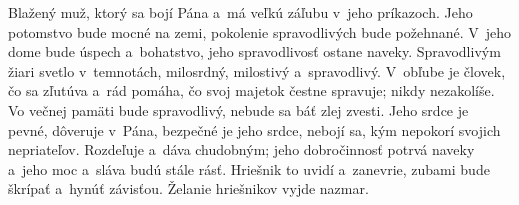 Blažený muž, ktorý sa bojí Pána
a~má veľkú záľubu v~jeho príkazoch.
\versseparator
Jeho potomstvo bude mocné na zemi,
pokolenie spravodlivých bude požehnané.
\versseparator
V~jeho dome bude úspech a~bohatstvo,
jeho spravodlivosť ostane naveky.
\versseparator
Spravodlivým žiari svetlo v~temnotách,
milosrdný, milostivý a~spravodlivý.
\versseparator
V~obľube je človek, čo sa zľutúva a~rád pomáha,
čo svoj majetok čestne spravuje;
nikdy nezakolíše.
\versseparator
Vo večnej pamäti bude spravodlivý,
nebude sa báť zlej zvesti.
\versseparator
Jeho srdce je pevné, dôveruje v~Pána,
bezpečné je jeho srdce, nebojí sa,
kým nepokorí svojich nepriateľov.
\versseparator
Rozdeľuje a~dáva chudobným;
jeho dobročinnosť potrvá naveky
a~jeho moc a~sláva budú stále rásť.
\versseparator
Hriešnik to uvidí a~zanevrie,
zubami bude škrípať a~hynúť závisťou.
Želanie hriešnikov vyjde nazmar.